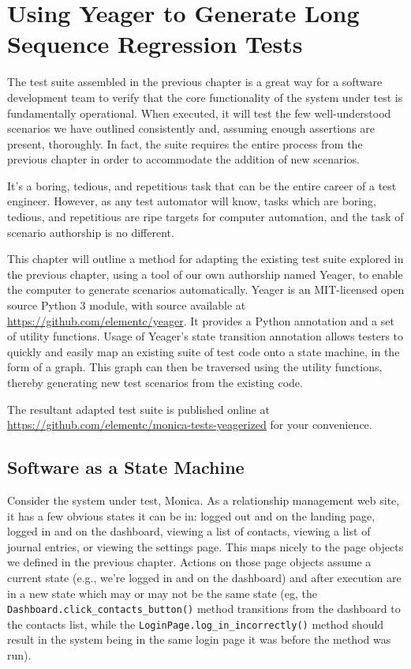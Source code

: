 \chapter{Using Yeager to Generate Long Sequence Regression Tests}
The test suite assembled in the previous chapter is a great way for a software development team to verify that the core functionality of the system under test is fundamentally operational. When executed, it will test the few well-understood scenarios we have outlined consistently and, assuming enough assertions are present, thoroughly. In fact, the suite requires the entire process from the previous chapter in order to accommodate the addition of new scenarios.

It's a boring, tedious, and repetitious task that can be the entire career of a test engineer. However, as any test automator will know, tasks which are boring, tedious, and repetitious are ripe targets for computer automation, and the task of scenario authorship is no different.

This chapter will outline a method for adapting the existing test suite explored in the previous chapter, using a tool of our own authorship named Yeager, to enable the computer to generate scenarios automatically. Yeager is an MIT-licensed open source Python 3 module, with source available at \url{https://github.com/elementc/yeager}. It provides a Python annotation and a set of utility functions. Usage of Yeager's state transition annotation allows testers to quickly and easily map an existing suite of test code onto a state machine, in the form of a graph. This graph can then be traversed using the utility functions, thereby generating new test scenarios from the existing code.

The resultant adapted test suite is published online at \url{https://github.com/elementc/monica-tests-yeagerized} for your convenience.

\section{Software as a State Machine}
Consider the system under test, Monica. As a relationship management web site, it has a few obvious states it can be in: logged out and on the landing page, logged in and on the dashboard, viewing a list of contacts, viewing a list of journal entries, or viewing the settings page. This maps nicely to the page objects we defined in the previous chapter. Actions on those page objects assume a current state (e.g., we're logged in and on the dashboard) and after execution are in a new state which may or may not be the same state (eg, the \texttt{Dashboard.click\_contacts\_button()} method transitions from the dashboard to the contacts list, while the \texttt{LoginPage.log\_in\_incorrectly()} method should result in the system being in the same login page it was before the method was run).

